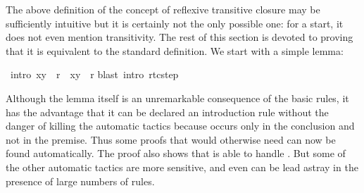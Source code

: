 \begin{isabellebody}
\begin{isamarkuptext}
The above definition of the concept of reflexive transitive closure may
be sufficiently intuitive but it is certainly not the only possible one:
for a start, it does not even mention transitivity.
The rest of this section is devoted to proving that it is equivalent to
the standard definition. We start with a simple lemma:%
\end{isamarkuptext}%
\isamarkuptrue%
\isamarkupfalse%
\ {}intro{}{}\ {}{}x{}y{}\ {}\ r\ {}\ {}x{}y{}\ {}\ r{}{}\isanewline
%
\isadelimproof
%
\endisadelimproof
%
\isatagproof
{}\isamarkupfalse%
{}blast\ intro{}\ rtc{}step{}%
\endisatagproof
{\isafoldproof}%
%
\isadelimproof
%
\endisadelimproof
%
\begin{isamarkuptext}%
\noindent
Although the lemma itself is an unremarkable consequence of the basic rules,
it has the advantage that it can be declared an introduction rule without the
danger of killing the automatic tactics because  occurs only in
the conclusion and not in the premise. Thus some proofs that would otherwise
need  can now be found automatically. The proof also
shows that  is able to handle . But
some of the other automatic tactics are more sensitive, and even  can be lead astray in the presence of large numbers of rules.


\end{isamarkuptext}
\end{isabellebody}
